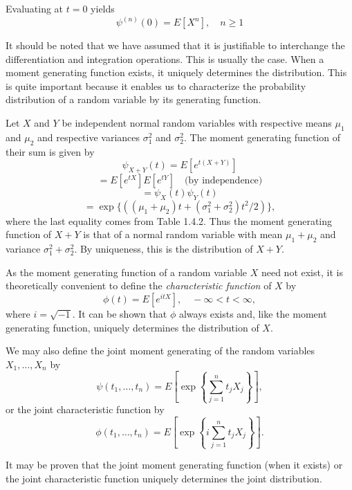 \documentclass[lang=cn,10pt,thmcnt=section]{elegantbook}
\begin{document}
Evaluating at \(t = 0\) yields
\[
\psi^{(n)}(0) = E[X^n], \quad n \geq 1
\]

It should be noted that we have assumed that it is justifiable to interchange the differentiation and integration operations. This is usually the case. When a moment generating function exists, it uniquely determines the distribution. This is quite important because it enables us to characterize the probability distribution of a random variable by its generating function.

\begin{example}
	Let $X$ and $Y$ be independent normal random variables with respective means $\mu_1$ and $\mu_2$ and respective variances $\sigma_1^2$ and $\sigma_2^2$. The moment generating function of their sum is given by
\[
\psi_{X+Y}(t) = E[e^{t(X+Y)}]
\]
\[
= E[e^{tX}] E[e^{tY}] \quad \text{(by independence)}
\]
\[
= \psi_X(t) \psi_Y(t)
\]
\[
= \exp\{((\mu_1 + \mu_2)t + (\sigma_1^2 + \sigma_2^2)t^2/2)\},
\]
where the last equality comes from Table 1.4.2. Thus the moment generating function of $X + Y$ is that of a normal random variable with mean $\mu_1 + \mu_2$ and variance $\sigma_1^2 + \sigma_2^2$. By uniqueness, this is the distribution of $X + Y$.

As the moment generating function of a random variable $X$ need not exist, it is theoretically convenient to define the \textit{characteristic function} of $X$ by
\[
\phi(t) = E[e^{itX}], \quad -\infty < t < \infty,
\]
where $i = \sqrt{-1}$. It can be shown that $\phi$ always exists and, like the moment generating function, uniquely determines the distribution of $X$.

We may also define the joint moment generating of the random variables $X_1, \ldots, X_n$ by
\[
\psi(t_1, \ldots, t_n) = E\left[\exp\left\{\sum_{j=1}^{n} t_j X_j\right\}\right],
\]
or the joint characteristic function by
\[
\phi(t_1, \ldots, t_n) = E\left[\exp\left\{i \sum_{j=1}^{n} t_j X_j\right\}\right].
\]

It may be proven that the joint moment generating function (when it exists) or the joint characteristic function uniquely determines the joint distribution.
\end{example}
\end{document}
